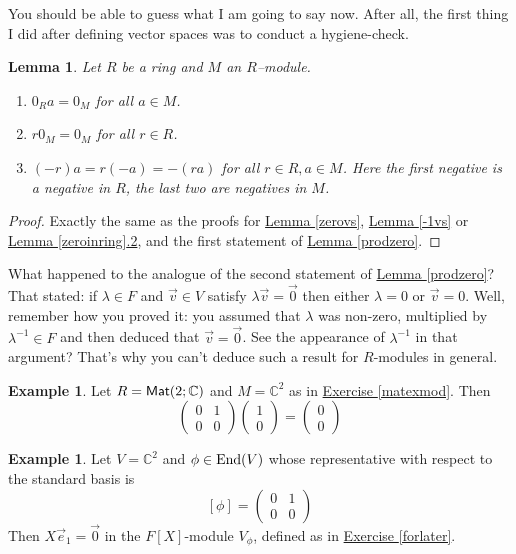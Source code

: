 \documentclass[11pt]{amsbook}
\newtheorem{lemma}[theorem]{Lemma}
\theoremstyle{definition}
\newtheorem{ex}[theorem]{Example}
\begin{document}
You should be able to guess what I am going to say now. After all, the first thing I did after defining vector spaces was to conduct a hygiene-check.

\begin{lemma} Let $R$ be a ring and $M$ an $R$--module.
 \begin{enumerate}
 \item $0_R a = 0_M$ for all $a\in M$.
 \item $r0_M = 0_M$ for all $r\in R$.
 \item $(-r)a = r (-a) = - (ra)$ for all $r\in R, a\in M$. Here the first negative is a negative in $R$, the last two are negatives in $M$.
 \end{enumerate}
\end{lemma}
\begin{proof} Exactly the same as the proofs for \hyperref[zerovs]{Lemma \ref{zerovs}}, \hyperref[-1vs]{Lemma \ref{-1vs}} or \hyperref[zeroinring]{Lemma \ref{zeroinring}.2},  and the first statement of \hyperref[prodzero]{Lemma \ref{prodzero}}.
\end{proof}
What happened to the analogue of the second statement of \hyperref[prodzero]{Lemma \ref{prodzero}}? That stated: if $\lambda \in F$ and $\vec{v} \in V$ satisfy $\lambda \vec{v} = \vec{0}$ then either $\lambda = 0$ or $\vec{v} = 0$. Well, remember how you proved it: you assumed that $\lambda$ was non-zero, multiplied by $\lambda^{-1}\in F$ and then deduced that $\vec{v}=\vec{0}$. See the appearance of $\lambda^{-1}$ in that argument? That's why you can't deduce such a result for $R$-modules in general.

\begin{ex}
Let $R = {\sf Mat}(2; \mathbb{C})$ and $M = \mathbb{C}^2$ as in \hyperref[matexmod]{Exercise \ref{matexmod}}. Then $$\begin{pmatrix} 0 & 1 \\ 0 & 0  \end{pmatrix} \begin{pmatrix} 1 \\ 0 \end{pmatrix} = \begin{pmatrix} 0 \\ 0 \end{pmatrix}$$
\end{ex}

\begin{ex}
Let $V = \mathbb{C}^2$ and $\phi\in {\rm End}(V)$ whose representative with respect to the standard basis is $$[\phi] = \begin{pmatrix} 0 & 1 \\ 0 & 0 \end{pmatrix}$$ Then $X \vec{e}_1 = \vec{0}$ in the $F[X]$-module $V_\phi$, defined as in \hyperref[forlater]{Exercise \ref{forlater}}.
\end{ex}
\end{document}
